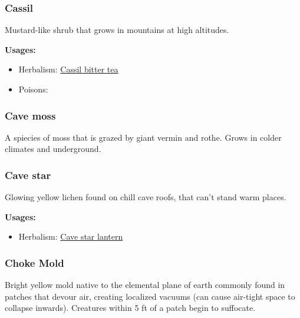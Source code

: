 \subsubsection{Cassil}
\label{Cassil}

Mustard-like shrub that grows in mountains at high altitudes.

\vspace{5mm}

\textbf{Usages:}

\begin{itemize}[noitemsep]
\item[] Herbalism: \hyperref[Cassil bitter tea]{Cassil bitter tea}
\item[] Poisons: \poison
\end{itemize}

\subsubsection{Cave moss}
\label{Cave moss}

A spiecies of moss that is grazed by giant vermin and rothe. Grows in colder climates and underground.

\subsubsection{Cave star}
\label{Cave star}

Glowing yellow lichen found on chill cave roofs, that can't stand warm places.

\vspace{5mm}

\textbf{Usages:}

\begin{itemize}[noitemsep]
\item[] Herbalism: \hyperref[Cave star lantern]{Cave star lantern}
\end{itemize}

\subsubsection{Choke Mold}
\label{Choke Mold}

Bright yellow mold native to the elemental plane of earth commonly found in patches that devour air, creating localized vacuums (can cause air-tight space to collapse inwards). Creatures within 5 ft of a patch begin to suffocate.

\vspace{5mm}

